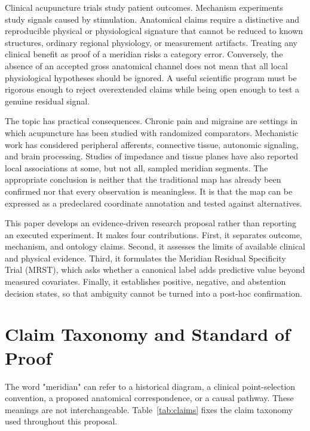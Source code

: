 \documentclass[conference]{IEEEtran}
\begin{document}
Clinical acupuncture trials study patient outcomes. Mechanism experiments study signals caused by stimulation. Anatomical claims require a distinctive and reproducible physical or physiological signature that cannot be reduced to known structures, ordinary regional physiology, or measurement artifacts. Treating any clinical benefit as proof of a meridian risks a category error. Conversely, the absence of an accepted gross anatomical channel does not mean that all local physiological hypotheses should be ignored. A useful scientific program must be rigorous enough to reject overextended claims while being open enough to test a genuine residual signal.

The topic has practical consequences. Chronic pain and migraine are settings in which acupuncture has been studied with randomized comparators. Mechanistic work has considered peripheral afferents, connective tissue, autonomic signaling, and brain processing. Studies of impedance and tissue planes have also reported local associations at some, but not all, sampled meridian segments. The appropriate conclusion is neither that the traditional map has already been confirmed nor that every observation is meaningless. It is that the map can be expressed as a predeclared coordinate annotation and tested against alternatives.

This paper develops an evidence-driven research proposal rather than reporting an executed experiment. It makes four contributions. First, it separates outcome, mechanism, and ontology claims. Second, it assesses the limits of available clinical and physical evidence. Third, it formulates the Meridian Residual Specificity Trial (MRST), which asks whether a canonical label adds predictive value beyond measured covariates. Finally, it establishes positive, negative, and abstention decision states, so that ambiguity cannot be turned into a post-hoc confirmation.

\section{Claim Taxonomy and Standard of Proof}

The word "meridian" can refer to a historical diagram, a clinical point-selection convention, a proposed anatomical correspondence, or a causal pathway. These meanings are not interchangeable. Table~\ref{tab:claims} fixes the claim taxonomy used throughout this proposal.
\end{document}
